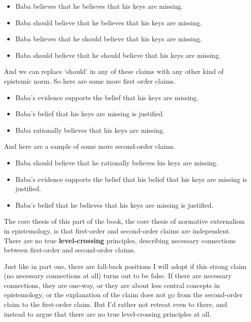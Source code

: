 \begin{itemize}
\item{} \gls{Baba} believes that he believes that his keys are missing.

\item{} \gls{Baba} should believe that he believes that his keys are missing.

\item{} \gls{Baba} believes that he should believe that his keys are missing.

\item{} \gls{Baba} should believe that he should believe that his keys are missing.

\end{itemize}
And we can replace `should' in any of these claims with any other kind of epistemic norm. So here are some more first order claims.

\begin{itemize}
\item{} \gls{Baba}'s evidence supports the belief that his keys are missing.

\item{} \gls{Baba}'s belief that his keys are missing is justified.

\item{} \gls{Baba} rationally believes that his keys are missing.

\end{itemize}
And here are a sample of some more second-order claims.

\begin{itemize}
\item{} \gls{Baba} should believe that he rationally believes his keys are missing.

\item{} \gls{Baba}'s evidence supports the belief that his belief that his keys are missing is justified.

\item{} \gls{Baba}'s belief that he believes that his keys are missing is justified.

\end{itemize}
The core thesis of this part of the book, the core thesis of normative externalism in epistemology, is that first-order and second-order claims are independent. There are no true \textbf{level-crossing} principles, describing necessary connections between first-order and second-order claims.

Just like in part one, there are fall-back positions I will adopt if this strong claim (no necessary connections at all) turns out to be false. If there are necessary connections, they are one-way, or they are about less central concepts in epistemology, or the explanation of the claim does not go from the second-order claim to the first-order claim. But I'd rather not retreat even to there, and instead to argue that there are no true level-crossing principles at all.

